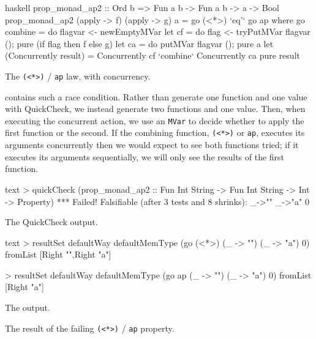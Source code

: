 \begin{listing}
\centering
\begin{cminted}{haskell}
prop_monad_ap2 :: Ord b => Fun a b -> Fun a b -> a -> Bool
prop_monad_ap2 (apply -> f) (apply -> g) a = go (<*>) `eq'` go ap where
  go combine = do
    flagvar <- newEmptyMVar
    let cf = do { flag <- tryPutMVar flagvar (); pure (if flag then f else g) }
    let ca = do { putMVar flagvar (); pure a }
    let (Concurrently result) = Concurrently cf `combine` Concurrently ca
    pure result
\end{cminted}
\caption{The \texttt{(<*>)} / \texttt{ap} law, with concurrency.}\label{lst:aplaw2}
\end{listing}

 contains such a race condition.  Rather than
generate one function and one value with QuickCheck, we instead
generate two functions and one value.  Then, when executing the
concurrent action, we use an \verb|MVar| to decide whether to apply
the first function or the second.  If the combining function,
\verb|(<*>)| or \verb|ap|, executes its arguments concurrently then we
would expect to see both functions tried; if it executes its arguments
sequentially, we will only see the results of the first function.

\begin{listing}
\begin{sublisting}{\textwidth}
\centering
\begin{cminted}{text}
> quickCheck (prop_monad_ap2 :: Fun Int String -> Fun Int String -> Int -> Property)
*** Failed! Falsifiable (after 3 tests and 8 shrinks):
{_->""}
{_->"a"}
0
\end{cminted}
\caption{The QuickCheck output.}\label{lst:aplaw3_quickcheck}
\end{sublisting}

\vspace{2.5em}

\begin{sublisting}{\textwidth}
\centering
\begin{cminted}{text}
> resultSet defaultWay defaultMemType (go (<*>) (\_ -> "") (\_ -> "a") 0)
fromList [Right "",Right "a"]

> resultSet defaultWay defaultMemType (go ap (\_ -> "") (\_ -> "a") 0)
fromList [Right "a"]
\end{cminted}
\caption{The \dejafu{} output.}\label{lst:aplaw3_dejafu}
\end{sublisting}
\caption{The result of the failing \texttt{(<*>)} / \texttt{ap} property.}\label{lst:aplaw3}
\end{listing}

